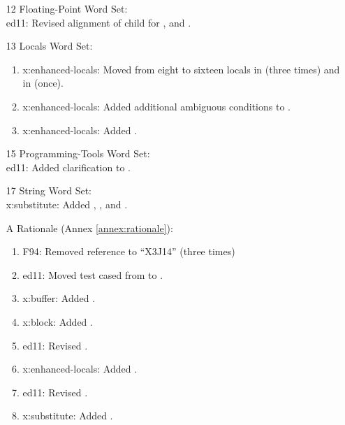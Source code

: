 \begin{itemize}
	\item[12] Floating-Point Word Set: \\		%
		\textsf{ed11}: Revised alignment of child for
			,
			 and
			.

	\item[13] Locals Word Set:						%
		\begin{enumerate}
		\item \textsf{x:enhanced-locals}:
			Moved from eight to sixteen locals in
			 (three times)
			and in  (once).
		\item \textsf{x:enhanced-locals}:
			Added additional ambiguous conditions to
			.
		\item \textsf{x:enhanced-locals}:
			Added .
		\end{enumerate}

	\item[15] Programming-Tools Word Set: \\	%
		\textsf{ed11}: Added clarification to .

	\item[17] String Word Set: \\					%
		\textsf{x:substitute}:
			Added ,
			,
			 and
			.

	\item[A] Rationale								(Annex \ref{annex:rationale}):
		\begin{enumerate}
		\item \textsf{F94}: Removed reference to ``X3J14'' (three times)
		\item \textsf{ed11}: Moved test cased from  to .
		\item \textsf{x:buffer}: Added .
		\item \textsf{x:block}: Added .
		\item \textsf{ed11}: Revised .
		\item \textsf{x:enhanced-locals}:
			Added .
		\item \textsf{ed11}: Revised .
		\item \textsf{x:substitute}: Added .
		\end{enumerate}
		

\end{itemize}
